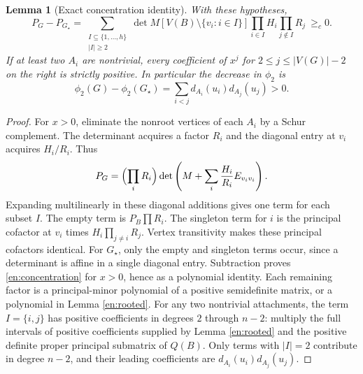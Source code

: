 \documentclass[12pt]{amsart}
\newtheorem{lem}[thm]{Lemma}
\theoremstyle{definition}
\theoremstyle{remark}
\numberwithin{equation}{section}
\begin{document}
\begin{lem}[Exact concentration identity]\label{en:concentrate}
With these hypotheses,
\begin{equation}\label{en:concentration}
 P_G-P_{G_\star}=
 \sum_{\substack{I\subseteq\{1,\ldots,h\}\\|I|\ge2}}
 \det M[V(B)\setminus\{v_i:i\in I\}]
 \prod_{i\in I}H_i\prod_{j\notin I}R_j\ \ge_c0.
\end{equation}
If at least two $A_i$ are nontrivial, every coefficient of $x^j$ for
$2\le j\le |V(G)|-2$ on the right is strictly positive.
In particular the decrease in $\phi_2$ is
\[
 \phi_2(G)-\phi_2(G_\star)
   =\sum_{i<j}d_{A_i}(u_i)d_{A_j}(u_j)>0.
\]
\end{lem}
\begin{proof}
For $x>0$, eliminate the nonroot vertices of each $A_i$ by a Schur
complement. The determinant acquires a factor $R_i$ and the diagonal
entry at $v_i$ acquires $H_i/R_i$. Thus
\[
 P_G=\Bigl(\prod_iR_i\Bigr)
 \det\left(M+\sum_i\frac{H_i}{R_i}E_{v_iv_i}\right).
\]
Expanding multilinearly in these diagonal additions gives one term for
each subset $I$. The empty term is $P_B\prod R_i$. The singleton term for
$i$ is the principal cofactor at $v_i$ times $H_i\prod_{j\ne i}R_j$.
Vertex transitivity makes these principal cofactors identical. For
$G_\star$, only the empty and singleton terms occur, since a determinant
is affine in a single diagonal entry. Subtraction proves
\eqref{en:concentration} for $x>0$, hence as a polynomial identity.
Each remaining factor is a principal-minor polynomial of a positive
semidefinite matrix, or a polynomial in Lemma \ref{en:rooted}.
For any two nontrivial attachments, the term $I=\{i,j\}$ has positive
coefficients in degrees $2$ through $n-2$: multiply the full intervals
of positive coefficients supplied by Lemma \ref{en:rooted} and the
positive definite proper principal submatrix of $Q(B)$.
Only terms with $|I|=2$ contribute in degree $n-2$, and their leading
coefficients are $d_{A_i}(u_i)d_{A_j}(u_j)$.
\end{proof}
\end{document}
